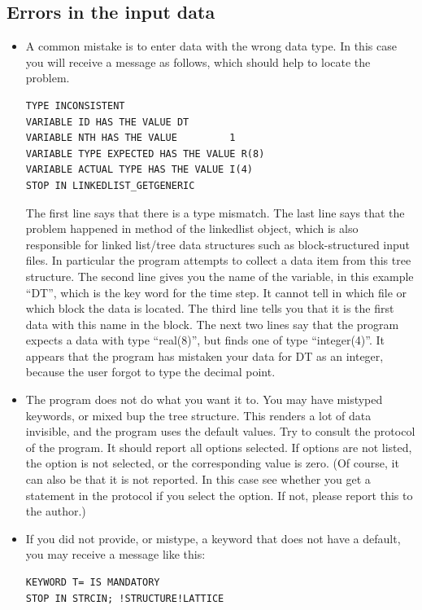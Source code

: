 \documentclass[final,12pt]{article}
\begin{document}
\subsection{Errors in the input data}

\begin{itemize}
\item A common mistake is to enter data with the wrong data type.
  In this case you will receive a message as follows, which should help
  to locate the problem.
\begin{verbatim}
TYPE INCONSISTENT
VARIABLE ID HAS THE VALUE DT
VARIABLE NTH HAS THE VALUE         1
VARIABLE TYPE EXPECTED HAS THE VALUE R(8)
VARIABLE ACTUAL TYPE HAS THE VALUE I(4)
STOP IN LINKEDLIST_GETGENERIC
\end{verbatim}
The first line says that there is a type mismatch. The last line
says that the problem happened in method of the linkedlist object,
which is also responsible for linked list/tree data structures such as
block-structured input files. In particular the program attempts to
collect a data item from this tree structure.  The second line gives
you the name of the variable, in this example ``DT'', which is the key
word for the time step. It cannot tell in which file or which block
the data is located. The third line tells you that it is the first
data with this name in the block. The next two lines say that the
program expects a data with type ``real(8)'', but finds one of type
``integer(4)''. It appears that the program has mistaken your data for
DT as an integer, because the user forgot to type the decimal point.
\item The program does not do what you want it to. You may have mistyped
  keywords, or mixed bup the tree structure. This renders a lot of data
  invisible, and the program uses the default values. Try to consult
  the protocol of the program. It should report all options selected.
  If options are not listed, the option is not selected, or the
  corresponding value is zero. (Of course, it can also be that it is
  not reported. In this case see whether you get a statement in the
  protocol if you select the option. If not, please report this to the
  author.)
\item If you did not provide, or mistype, a keyword that does not have
  a default, you may receive a message like this:
\begin{verbatim}
KEYWORD T= IS MANDATORY
STOP IN STRCIN; !STRUCTURE!LATTICE
\end{verbatim}

\end{itemize}
\end{document}
